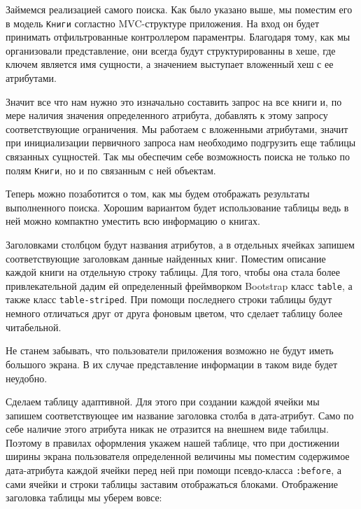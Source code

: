 Займемся реализацией самого поиска. Как было указано выше, мы поместим
его в модель \verb|Книги| согластно MVC-структуре приложения.
На вход он будет принимать отфильтрованные контроллером параментры.
Благодаря тому, как мы организовали представление, они всегда будут
структурированны в хеше, где ключем является имя сущности, а значением
выступает вложенный хеш с ее атрибутами.

Значит все что нам нужно это изначально составить запрос
на все книги и, по мере
наличия значения определенного атрибута, добавлять к этому запросу
соответствующие ограничения. Мы работаем с вложенными атрибутами,
значит при инициализации первичного запроса нам необходимо подгрузить еще
таблицы связанных сущностей. Так мы обеспечим себе возможность
поиска не только по полям \verb|Книги|, но и по связанным с ней объектам.

\begin{small}

\end{small}

Теперь можно позаботится о том, как мы будем отображать результаты
выполненного поиска. Хорошим вариантом будет использование таблицы
ведь в ней можно компактно уместить всю информацию о книгах.

Заголовками столбцом будут названия атрибутов, а в отдельных ячейках
запишем соответствующие заголовкам данные найденных книг. Поместим
описание каждой книги на отдельную строку таблицы. Для
того, чтобы она стала более привлекательной дадим ей определенный
фреймворком Bootstrap класс \texttt{table}, а
также класс \texttt{table-striped}. При помощи последнего строки таблицы будут
немного отличаться друг от друга фоновым цветом, что сделает таблицу более
читабельной.

Не станем забывать, что пользователи приложения возможно не будут
иметь большого экрана. В их случае представление информации в таком виде
будет неудобно.

Сделаем таблицу адаптивной. Для этого при создании каждой ячейки мы
запишем соответствующее им название заголовка столба в дата-атрибут.
Само по себе наличие этого атрибута никак не отразится на внешнем виде
табилцы. Поэтому в правилах оформления укажем нашей таблице, что при
достижении ширины экрана пользователя определенной величины мы поместим
содержимое дата-атрибута каждой ячейки перед ней при помощи псевдо-класса
\texttt{:before}, а сами ячейки и строки таблицы
заставим отображаться блоками. Отображение заголовка таблицы мы уберем вовсе:
\begin{small}

\end{small}

